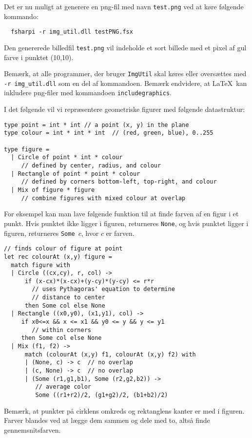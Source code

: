 \noindent
Det er nu muligt at generere en png-fil med navn \texttt{test.png} ved
at køre følgende kommando:

\vspace{-4mm}
\begin{verbatim}
  fsharpi -r img_util.dll testPNG.fsx
\end{verbatim}
\vspace{-4mm}

\noindent
Den genererede billedfil \texttt{test.png} vil indeholde
et sort billede med et pixel af gul farve i punktet (10,10).

\noindent
Bemærk, at alle programmer, der bruger \texttt{ImgUtil} skal køres
eller oversættes med \texttt{-r img\_util.dll} som en del af
kommandoen.
%
Bemærk endvidere, at \LaTeX\ kan inkludere png-filer med
kommandoen \texttt{includegraphics}.

\vspace{2ex}

\noindent
I det følgende vil vi repræsentere geometriske figurer med følgende
datastruktur:

\begin{lstlisting}[numbers=none,frame=none,mathescape]
type point = int * int // a point (x, y) in the plane
type colour = int * int * int  // (red, green, blue), 0..255

type figure =
  | Circle of point * int * colour
     // defined by center, radius, and colour
  | Rectangle of point * point * colour
     // defined by corners bottom-left, top-right, and colour
  | Mix of figure * figure
     // combine figures with mixed colour at overlap
\end{lstlisting}

\noindent
For eksempel kan man lave følgende funktion til at finde farven af en
figur i et punkt.  Hvis punktet ikke ligger i figuren, returneres
\texttt{None}, og hvis punktet ligger i figuren, returneres
\texttt{Some $c$}, hvor $c$ er farven.

\begin{lstlisting}[numbers=none,frame=none,mathescape]
// finds colour of figure at point
let rec colourAt (x,y) figure =
  match figure with
  | Circle ((cx,cy), r, col) ->
      if (x-cx)*(x-cx)+(y-cy)*(y-cy) <= r*r
        // uses Pythagoras' equation to determine
        // distance to center
      then Some col else None
  | Rectangle ((x0,y0), (x1,y1), col) ->
     if x0<=x && x <= x1 && y0 <= y && y <= y1
        // within corners
     then Some col else None
  | Mix (f1, f2) ->
      match (colourAt (x,y) f1, colourAt (x,y) f2) with
      | (None, c) -> c  // no overlap
      | (c, None) -> c  // no overlap
      | (Some (r1,g1,b1), Some (r2,g2,b2)) ->
         // average color
         Some ((r1+r2)/2, (g1+g2)/2, (b1+b2)/2)
\end{lstlisting}

\noindent
Bemærk, at punkter på cirklens omkreds og rektanglens kanter er med i
figuren.  Farver blandes ved at lægge dem sammen og dele med to, altså
finde gennemsnitsfarven.
